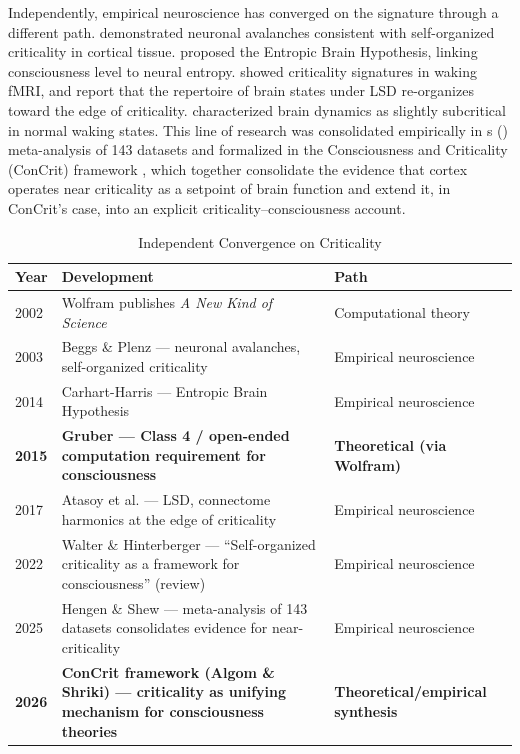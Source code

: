 \documentclass[12pt]{article}
\begin{document}
Independently, empirical neuroscience has converged on the signature through a different path. \citet{Beggs2003} demonstrated neuronal avalanches consistent with self-organized criticality in cortical tissue. \citet{CarhartHarris2014} proposed the Entropic Brain Hypothesis, linking consciousness level to neural entropy. \citet{Tagliazucchi2012} showed criticality signatures in waking fMRI, and \citet{Atasoy2017} report that the repertoire of brain states under LSD re-organizes toward the edge of criticality. \citet{Priesemann2013,Priesemann2014} characterized brain dynamics as slightly subcritical in normal waking states. This line of research was consolidated empirically in \citeauthor{HengenShew2025}\textquotesingle s (\citeyear{HengenShew2025}) meta-analysis of 143 datasets and formalized in the Consciousness and Criticality (ConCrit) framework \citep{AlgomShriki2026}, which together consolidate the evidence that cortex operates near criticality as a setpoint of brain function and extend it, in ConCrit's case, into an explicit criticality--consciousness account.

\begin{table}[htbp]
\caption{Independent Convergence on Criticality}
\centering
\small
\begin{tabularx}{\textwidth}{lXl}
\toprule
\textbf{Year} & \textbf{Development} & \textbf{Path} \\
\midrule
2002 & Wolfram publishes \emph{A New Kind of Science} & Computational theory \\
2003 & Beggs \& Plenz --- neuronal avalanches, self-organized criticality & Empirical neuroscience \\
2014 & Carhart-Harris --- Entropic Brain Hypothesis & Empirical neuroscience \\
\textbf{2015} & \textbf{Gruber --- Class 4 / open-ended computation requirement for consciousness} & \textbf{Theoretical (via Wolfram)} \\
2017 & Atasoy et al. --- LSD, connectome harmonics at the edge of criticality & Empirical neuroscience \\
2022 & Walter \& Hinterberger --- ``Self-organized criticality as a framework for consciousness'' (review) & Empirical neuroscience \\
2025 & Hengen \& Shew --- meta-analysis of 143 datasets consolidates evidence for near-criticality & Empirical neuroscience \\
\textbf{2026} & \textbf{ConCrit framework (Algom \& Shriki) --- criticality as unifying mechanism for consciousness theories} & \textbf{Theoretical/empirical synthesis} \\
\bottomrule
\end{tabularx}
\end{table}
\end{document}
